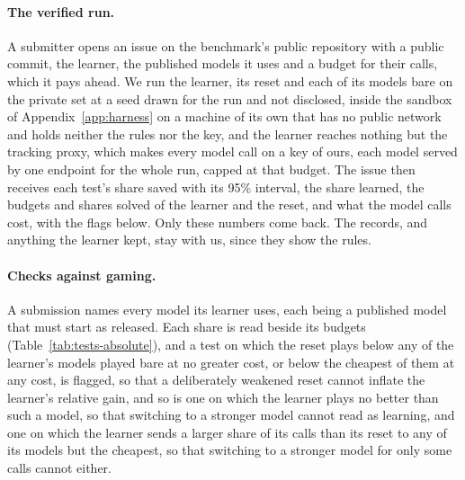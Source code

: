 \paragraph{The verified run.} A submitter opens an issue on the benchmark's public repository with a public commit, the learner, the published models it uses and a budget for their calls, which it pays ahead. We run the learner, its reset and each of its models bare on the private set at a seed drawn for the run and not disclosed, inside the sandbox of Appendix~\ref{app:harness} on a machine of its own that has no public network and holds neither the rules nor the key, and the learner reaches nothing but the tracking proxy, which makes every model call on a key of ours, each model served by one endpoint for the whole run, capped at that budget. The issue then receives each test's share saved with its 95\% interval, the share learned, the budgets and shares solved of the learner and the reset, and what the model calls cost, with the flags below. Only these numbers come back. The records, and anything the learner kept, stay with us, since they show the rules.

\paragraph{Checks against gaming.} A submission names every model its learner uses, each being a published model that must start as released. Each share is read beside its budgets (Table~\ref{tab:tests-absolute}), and a test on which the reset plays below any of the learner's models played bare at no greater cost, or below the cheapest of them at any cost, is flagged, so that a deliberately weakened reset cannot inflate the learner's relative gain, and so is one on which the learner plays no better than such a model, so that switching to a stronger model cannot read as learning, and one on which the learner sends a larger share of its calls than its reset to any of its models but the cheapest, so that switching to a stronger model for only some calls cannot either.

